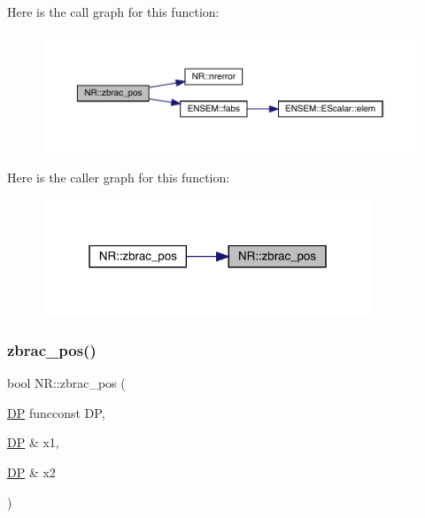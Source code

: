Here is the call graph for this function\+:
\nopagebreak
\begin{figure}[H]
\begin{center}
\leavevmode
\includegraphics[width=350pt]{da/d46/namespaceNR_ab8c06a4592a772cfbeed372a197e2538_cgraph}
\end{center}
\end{figure}
Here is the caller graph for this function\+:
\nopagebreak
\begin{figure}[H]
\begin{center}
\leavevmode
\includegraphics[width=280pt]{da/d46/namespaceNR_ab8c06a4592a772cfbeed372a197e2538_icgraph}
\end{center}
\end{figure}
\mbox{\label{namespaceNR_afec512a07e73837d2a2f77ccbbce93db}} 
\subsubsection{\texorpdfstring{zbrac\_pos()}{zbrac\_pos()}\hspace{0.1cm}{\footnotesize\ttfamily [2/2]}}
{\footnotesize\ttfamily bool N\+R\+::zbrac\+\_\+pos (\begin{DoxyParamCaption}\item[{\mbox{\hyperlink{namespaceNR_af6ff762dd605ff477b8e52387253a02a}{DP}} }]{funcconst DP,  }\item[{\mbox{\hyperlink{namespaceNR_af6ff762dd605ff477b8e52387253a02a}{DP}} \&}]{x1,  }\item[{\mbox{\hyperlink{namespaceNR_af6ff762dd605ff477b8e52387253a02a}{DP}} \&}]{x2 }\end{DoxyParamCaption})}

